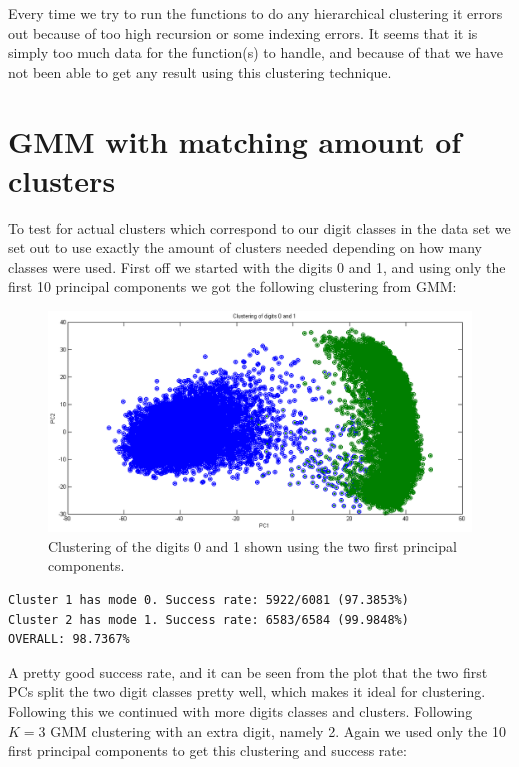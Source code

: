 Every time we try to run the functions to do any hierarchical clustering it errors out because of too high recursion or some indexing errors. It seems that it is simply too much data for the function(s) to handle, and because of that we have not been able to get any result using this clustering technique.


\section{GMM with matching amount of clusters}

To test for actual clusters which correspond to our digit classes in the data set we set out to use exactly the amount of clusters needed depending on how many classes were used. First off we started with the digits 0 and 1, and using only the first 10 principal components we got the following clustering from GMM:

\begin{figure}[H]
\centering
\includegraphics[width=1\linewidth]{code/gmm_0-1}
\caption{Clustering of the digits 0 and 1 shown using the two first principal components.}
\label{fig:gmm_0-1}
\end{figure}

\begin{verbatim}
Cluster 1 has mode 0. Success rate: 5922/6081 (97.3853%)
Cluster 2 has mode 1. Success rate: 6583/6584 (99.9848%)
OVERALL: 98.7367%
\end{verbatim}

A pretty good success rate, and it can be seen from the plot that the two first PCs split the two digit classes pretty well, which makes it ideal for clustering. \\

Following this we continued with more digits classes and clusters. Following $K=3$ GMM clustering with an extra digit, namely 2. Again we used only the 10 first principal components to get this clustering and success rate:

